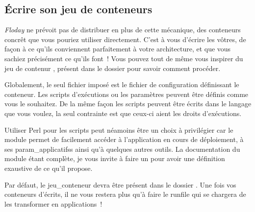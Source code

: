 \subsection{Écrire son jeu de conteneurs}

\emph{Floday} ne prévoit pas de distribuer en plus de cette mécanique, des conteneurs concrêt que vous pouriez utiliser directement.
C'est à vous d'écrire les vôtres, de façon à ce qu'ils conviennent parfaitement à votre architecture, et que vous sachiez précisément ce qu'ils font~!
Vous pouvez tout de même vous inspirer du jeu de contenur , présent dans le dossier  pour savoir comment procéder.

Globalement, le seul fichier imposé est le fichier de configuration définissant le conteneur.
Les scripts d'exécutions ou les paramètres peuvent être définis comme vous le souhaitez.
De la même façon les scripts peuvent être écrits dans le langage que vous voulez, la seul contrainte est que ceux-ci aient les droits d'exécutions.

Utiliser Perl pour les scripts peut néamoins être un choix à privilégier car le module  permet de facilement accéder à l'\gls{application} en cours de déploiement, à ses \glspl{param_applicatifs} ainsi qu'à quelques autres outils.
La documentation du module étant complète, je vous invite à faire un  pour avoir une définition exaustive de ce qu'il propose.

Par défaut, le \gls{jeu_conteneur} devra être présent dans le dossier .
Une fois vos conteneurs d'écrits, il ne vous restera plus qu'à faire le \gls{runfile} qui se chargera de les transformer en applications~!

